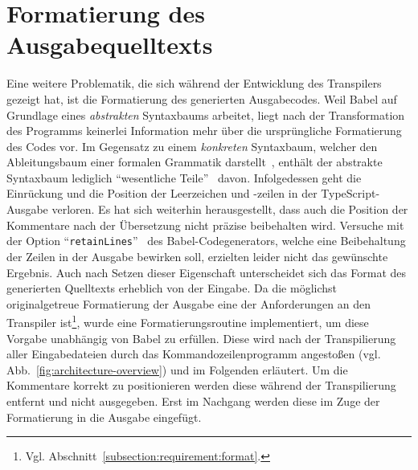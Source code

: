 \section{Formatierung des Ausgabequelltexts}
\label{sec:formatting}

Eine weitere Problematik, die sich während der Entwicklung des Transpilers gezeigt hat, ist die Formatierung des generierten Ausgabecodes. Weil Babel auf Grundlage eines \emph{abstrakten} Syntaxbaums arbeitet, liegt nach der Transformation des Programms keinerlei Information mehr über die ursprüngliche Formatierung des Codes vor. Im Gegensatz zu einem \emph{konkreten} Syntaxbaum, welcher den Ableitungsbaum einer formalen Grammatik darstellt~\autocite[45]{AHO:COMPILERS}, enthält der abstrakte Syntaxbaum lediglich \enquote{wesentliche Teile}~\autocite[21]{WALDMANN:PPS} davon. Infolgedessen geht die Einrückung und die Position der Leerzeichen und -zeilen in der TypeScript-Ausgabe verloren. Es hat sich weiterhin herausgestellt, dass auch die Position der Kommentare nach der Übersetzung nicht präzise beibehalten wird. Versuche mit der Option \enquote{\texttt{retainLines}}~\autocite{BABEL:GENERATOR} des Babel-Codegenerators, welche eine Beibehaltung der Zeilen in der Ausgabe bewirken soll, erzielten leider nicht das gewünschte Ergebnis. Auch nach Setzen dieser Eigenschaft unterscheidet sich das Format des generierten Quelltexts erheblich von der Eingabe. Da die möglichst originalgetreue Formatierung der Ausgabe eine der Anforderungen an den Transpiler ist\footnote{Vgl. Abschnitt~\ref{subsection:requirement:format}.}, wurde eine Formatierungsroutine implementiert, um diese Vorgabe unabhängig von Babel zu erfüllen. Diese wird nach der Transpilierung aller Eingabedateien durch das Kommandozeilenprogramm angestoßen (vgl. Abb.~\ref{fig:architecture-overview}) und im Folgenden erläutert. Um die Kommentare korrekt zu positionieren werden diese während der Transpilierung entfernt und nicht ausgegeben. Erst im Nachgang werden diese im Zuge der Formatierung in die Ausgabe eingefügt.


